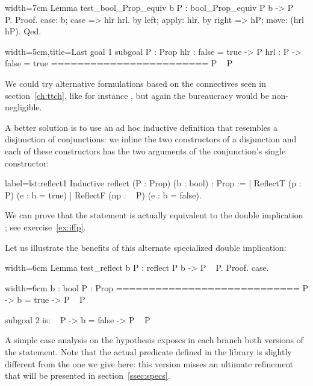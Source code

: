 \begin{coq}{}{width=7cm}
Lemma test_bool_Prop_equiv b P : bool_Prop_equiv P b -> P \/ ~ P.
Proof.
case: b; case => hlr hrl.
  by left; apply: hlr.
by right => hP; move: (hrl hP).
Qed.
\end{coq}
\begin{coqout}{}{width=5cm,title=Last goal}
1 subgoal
P : Prop
hlr : false = true -> P
hrl : P -> false = true
========================
P \/ ~ P
\end{coqout}
We could try
alternative formulations based on the connectives seen in
section~\ref{ch:ttch}, like for instance
, but again the bureaucracy
would be non-negligible.

A better solution is
to use an ad hoc inductive definition that resembles a
disjunction of conjunctions: we inline the two constructors of a
disjunction and each of these constructors has the two arguments of
the conjunction's single constructor:

\begin{coq}{}{label=lst:reflect1}
Inductive reflect (P : Prop) (b : bool) : Prop :=
| ReflectT (p : P)    (e : b = true)
| ReflectF (np : ~ P) (e : b = false).
\end{coq}

We can prove that the statement  is actually equivalent
to the double implication ; see exercise~\ref{ex:iffp}.

Let us illustrate the benefits of this alternate specialized double
implication:

\begin{coq}{}{width=6cm}
Lemma test_reflect b P :
  reflect P b -> P \/ ~ P.
Proof.
case.
\end{coq}
\begin{coqout}{}{width=6cm}
  b : bool
  P : Prop
  ============================
   P -> b = true -> P \/ ~ P

subgoal 2 is:
 ~ P -> b = false -> P \/ ~ P
\end{coqout}

A simple case analysis on the hypothesis  exposes in
each branch both versions of the statement.
Note that the actual
 predicate defined in the  library is
slightly different from the one we give here:
this version misses an ultimate refinement
that will be presented in
section~\ref{ssec:specs}.

